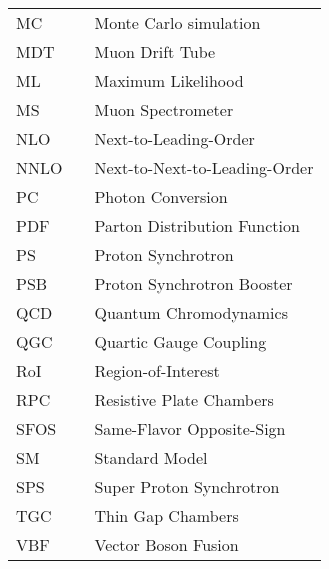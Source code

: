   \begin{tabular}{lp{}p{}}
    MC          & \dotfill & Monte Carlo simulation \\
    MDT         & \dotfill & Muon Drift Tube \\
    ML          & \dotfill & Maximum Likelihood \\
    MS          & \dotfill & Muon Spectrometer \\
    NLO         & \dotfill & Next-to-Leading-Order \\
    NNLO         & \dotfill & Next-to-Next-to-Leading-Order \\
    PC          & \dotfill & Photon Conversion \\
    PDF         & \dotfill & Parton Distribution Function \\
    PS          & \dotfill & Proton Synchrotron \\
    PSB         & \dotfill & Proton Synchrotron Booster \\
    QCD         & \dotfill & Quantum Chromodynamics \\
    QGC         & \dotfill & Quartic Gauge Coupling \\
    RoI         & \dotfill & Region-of-Interest \\
    RPC         & \dotfill & Resistive Plate Chambers \\
    SFOS        & \dotfill & Same-Flavor Opposite-Sign \\
    SM          & \dotfill & Standard Model  \\
    SPS         & \dotfill & Super Proton Synchrotron \\
    TGC         & \dotfill & Thin Gap Chambers \\
    VBF         & \dotfill & Vector Boson Fusion \\

  \end{tabular}



